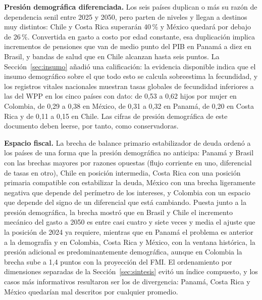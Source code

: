 \documentclass[12pt, letterpaper]{article}
\begin{document}
\textbf{Presión demográfica diferenciada.} Los seis países duplican o más su razón
de dependencia senil entre 2025 y 2050, pero parten de niveles y llegan a destinos
muy distintos: Chile y Costa Rica superarán 40\,\% y México quedará por debajo de
26\,\%. Convertida en gasto a costo por edad constante, esa duplicación implica
incrementos de pensiones que van de medio punto del PIB en Panamá a diez en
Brasil, y bandas de salud que en Chile alcanzan hasta seis puntos. La
Sección~\ref{sec:insumo} añadió una calificación: la evidencia disponible indica
que el insumo demográfico sobre el que todo esto se calcula sobreestima la
fecundidad, y los registros vitales nacionales muestran tasas globales de
fecundidad inferiores a las del WPP en los cinco países con dato: de 0,53 a 0,62
hijos por mujer en Colombia, de 0,29 a 0,38 en México, de 0,31 a 0,32 en Panamá,
de 0,20 en Costa Rica y de 0,11 a 0,15 en Chile. Las cifras de presión demográfica
de este documento deben leerse, por tanto, como conservadoras.

\textbf{Espacio fiscal.} La brecha de balance primario estabilizador de deuda
ordenó a los países de una forma que la presión demográfica no anticipa: Panamá y
Brasil con las brechas mayores por razones opuestas (flujo corriente en uno,
diferencial de tasas en otro), Chile en posición intermedia, Costa Rica
con una posición primaria compatible con estabilizar la deuda, México con una
brecha ligeramente negativa que depende del perímetro de los intereses, y Colombia
con un espacio que depende del signo de un diferencial que está cambiando. Puesta
junto a la presión demográfica, la brecha mostró que en Brasil y Chile el
incremento mecánico del gasto a 2050 es entre casi cuatro y siete veces y media el ajuste
que la posición de 2024 ya requiere, mientras que en Panamá el problema es anterior
a la demografía y en Colombia, Costa Rica y México, con la ventana histórica, la presión adicional es predominantemente demográfica, aunque
en Colombia la brecha sube a 1,4 puntos con la proyección del FMI. El ordenamiento por dimensiones separadas de la
Sección~\ref{sec:sintesis} evitó un índice compuesto, y los casos
más informativos resultaron ser los de divergencia: Panamá, Costa Rica y México
quedarían mal descritos por cualquier promedio.
\end{document}
